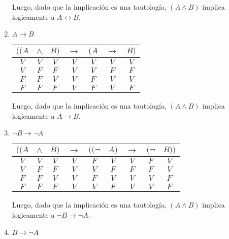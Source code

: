 \documentclass[osajnl,twocolumn,showpacs,superscriptaddress,10pt]{revtex4-1} %
\begin{document}
\begin{enumerate}[i-]
  Luego, dado que la implicación es una tautología, $(A \wedge B)$ implica logicamente a $A \leftrightarrow B$. \\

  \item $A \rightarrow B$

  \begin{table}[h!]
    \setlength{\tabcolsep}{1.0em}
    \centering
    \begin{tabular}{ccc|c|ccc}
      $((A$ & $\wedge$ & $B)$ & $\rightarrow$ & $(A$ & $\rightarrow$ & $B)$ \\
      \hline
      $V$ & $V$ & $V$ & $V$ & $V$ & $V$ & $V$ \\
      $V$ & $F$ & $F$ & $V$ & $V$ & $F$ & $F$ \\
      $F$ & $F$ & $V$ & $V$ & $F$ & $V$ & $V$ \\
      $F$ & $F$ & $F$ & $V$ & $F$ & $V$ & $F$
    \end{tabular}
  \end{table}

  Luego, dado que la implicación es una tautología, $(A \wedge B)$ implica logicamente a $A \rightarrow B$. \\

  \item $\neg B \rightarrow \neg A$

  \begin{table}[h!]
    \setlength{\tabcolsep}{1.0em}
    \centering
    \begin{tabular}{ccc|c|ccccc}
      $((A$ & $\wedge$ & $B)$ & $\rightarrow$ & $((\neg$ & $A)$ & $\rightarrow$ & $(\neg$ & $B))$ \\
      \hline
      $V$ & $V$ & $V$ & $V$ & $F$ & $V$ & $V$ & $F$ & $V$ \\
      $V$ & $F$ & $F$ & $V$ & $V$ & $F$ & $F$ & $F$ & $V$ \\
      $F$ & $F$ & $V$ & $V$ & $F$ & $V$ & $V$ & $V$ & $F$ \\
      $F$ & $F$ & $F$ & $V$ & $V$ & $F$ & $V$ & $V$ & $F$
    \end{tabular}
  \end{table}

  Luego, dado que la implicación es una tautología, $(A \wedge B)$ implica logicamente a $\neg B \rightarrow \neg A$. \\

  \item $B \rightarrow \neg A$


\end{enumerate}
\end{document}
